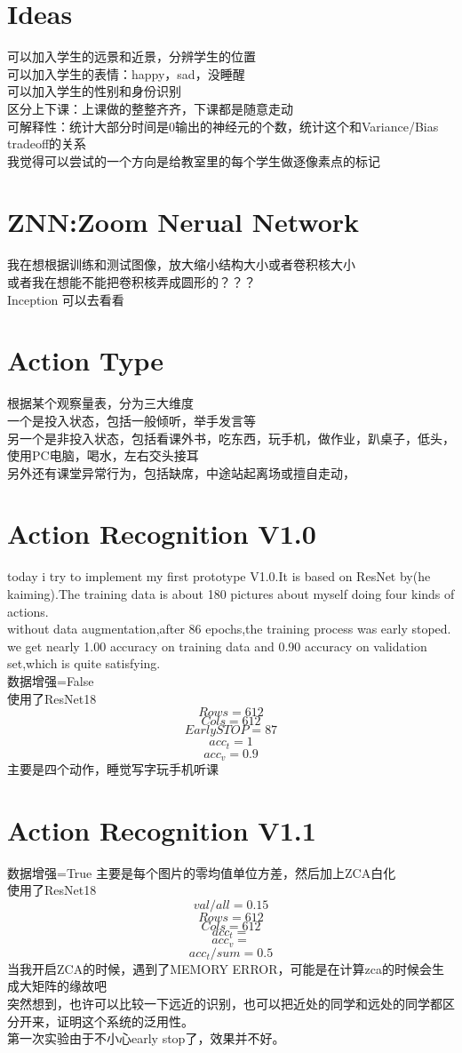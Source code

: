 \documentclass[]{article}
\begin{document}
\begin{CJK}{UTF8}{}
\section{Ideas}
可以加入学生的远景和近景，分辨学生的位置\\
可以加入学生的表情：happy，sad，没睡醒\\
可以加入学生的性别和身份识别\\
区分上下课：上课做的整整齐齐，下课都是随意走动\\
可解释性：统计大部分时间是0输出的神经元的个数，统计这个和Variance/Bias tradeoff的关系\\
我觉得可以尝试的一个方向是给教室里的每个学生做逐像素点的标记\\
\section{ZNN:Zoom Nerual Network}
我在想根据训练和测试图像，放大缩小结构大小或者卷积核大小\\
或者我在想能不能把卷积核弄成圆形的？？？\\
Inception 可以去看看\\
\section{Action Type}
根据某个观察量表，分为三大维度\\
一个是投入状态，包括一般倾听，举手发言等\\
另一个是非投入状态，包括看课外书，吃东西，玩手机，做作业，趴桌子，低头，使用PC电脑，喝水，左右交头接耳\\
另外还有课堂异常行为，包括缺席，中途站起离场或擅自走动，
\section{Action Recognition V1.0}
today i try to implement my first prototype V1.0.It is based on ResNet by(he kaiming).The training data is about 180 pictures about myself doing four kinds of actions.\\
without data augmentation,after 86 epochs,the training process was early stoped.
we get nearly 1.00 accuracy on training data and 0.90 accuracy on validation set,which is quite satisfying.\\
数据增强=False\\
使用了ResNet18
$$Rows=612$$
$$Cols=612$$
$$EarlySTOP = 87$$
$$acc_t=1$$
$$acc_v=0.9$$
主要是四个动作，睡觉写字玩手机听课
\section{Action Recognition V1.1}
数据增强=True 主要是每个图片的零均值单位方差，然后加上ZCA白化\\
使用了ResNet18
$$val/all=0.15$$
$$Rows=612$$
$$Cols=612$$
$$acc_t=$$
$$acc_v=$$
$$acc_t/sum=0.5$$
当我开启ZCA的时候，遇到了MEMORY ERROR，可能是在计算zca的时候会生成大矩阵的缘故吧\\
突然想到，也许可以比较一下远近的识别，也可以把近处的同学和远处的同学都区分开来，证明这个系统的泛用性。\\
第一次实验由于不小心early stop了，效果并不好。


\end{CJK}
\end{document}
